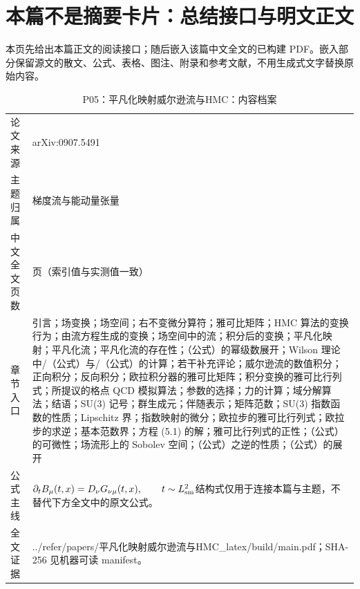 \documentclass[UTF8,11pt,oneside]{ctexbook}
\begin{document}
\section*{本篇不是摘要卡片：总结接口与明文正文}
本页先给出本篇正文的阅读接口；随后嵌入该篇中文全文的已构建 PDF。嵌入部分保留源文的散文、公式、表格、图注、附录和参考文献，不用生成式文字替换原始内容。
\begin{table}[htbp]
  \centering
  \caption{P05：平凡化映射威尔逊流与HMC：内容档案}
  \small
  \begin{tabularx}{0.96\textwidth}{@{}p{3.3cm}>{\raggedright\arraybackslash}X@{}}
    \toprule
    论文来源 & arXiv:0907.5491 \\
    主题归属 & 梯度流与能动量张量 \\
    中文全文页数 & 18 页（索引值与实测值一致） \\
    章节入口 & 引言；场变换；场空间；右不变微分算符；雅可比矩阵；HMC 算法的变换行为；由流方程生成的变换；场空间中的流；积分后的变换；平凡化映射；平凡化流；平凡化流的存在性；（公式）的幂级数展开；Wilson 理论中/（公式）与/（公式）的计算；若干补充评论；威尔逊流的数值积分；正向积分；反向积分；欧拉积分器的雅可比矩阵；积分变换的雅可比行列式；所提议的格点 QCD 模拟算法；参数的选择；力的计算；域分解算法；结语；SU(3) 记号；群生成元；伴随表示；矩阵范数；SU(3) 指数函数的性质；Lipschitz 界；指数映射的微分；欧拉步的雅可比行列式；欧拉步的求逆；基本范数界；方程 (5.1) 的解；雅可比行列式的正性；（公式）的可微性；场流形上的 Sobolev 空间；（公式）之逆的性质；（公式）的展开 \\
    公式主线 & $\partial_t B_\mu(t,x)=D_\nu G_{\nu\mu}(t,x),\qquad t\sim L_{\rm sm}^{2}$\newline\scriptsize 结构式仅用于连接本篇与主题，不替代下方全文中的原文公式。 \\
    全文证据 & ../\allowbreak{}refer/\allowbreak{}papers/\allowbreak{}平凡化映射威尔逊流与HMC\_\allowbreak{}latex/\allowbreak{}build/\allowbreak{}main.pdf；SHA-256 见机器可读 manifest。 \\
    \bottomrule
  \end{tabularx}
\end{table}
\end{document}
